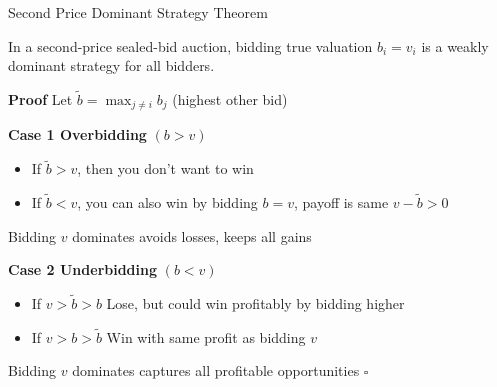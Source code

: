\documentclass[xcolor={x11names}]{beamer}
\begin{document}
\begin{frame}{Second Price Dominant Strategy Theorem}
\begin{theorem}
In a second-price sealed-bid auction, bidding true valuation $b_i = v_i$ is a weakly dominant strategy for all bidders.
\end{theorem}
\textbf{Proof} Let $\tilde{b} = \max_{j \neq i} b_j$ (highest other bid)

\textbf{Case 1 Overbidding} $(b > v)$
\begin{itemize}
    \item If $\tilde{b}> v$, then you don't want to win
    \item If $\tilde{b}< v$, you can also win by bidding $b=v$, payoff is same $v-\tilde{b}>0$
\end{itemize}
Bidding $v$ dominates avoids losses, keeps all gains

\textbf{Case 2 Underbidding} $(b < v)$
\begin{itemize}
  \item If $v > \tilde{b} > b$ Lose, but could win profitably by bidding higher
  \item If $v > b > \tilde{b}$ Win with same profit as bidding $v$ 
\end{itemize}
Bidding $v$ dominates captures all profitable opportunities $\square$
\end{frame}
\end{document}
